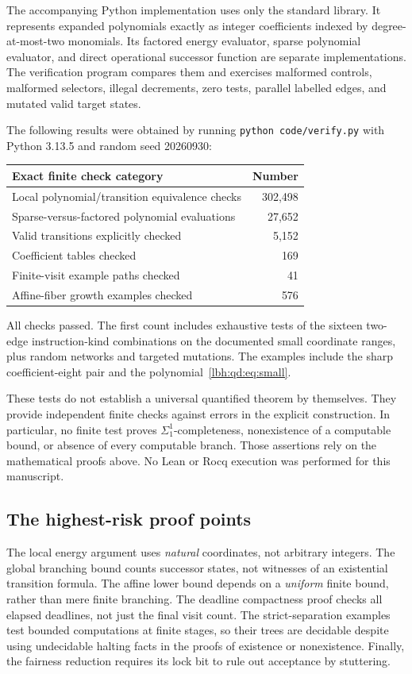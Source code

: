 \documentclass[11pt,letterpaper]{article}
\theoremstyle{definition}
\theoremstyle{remark}
\newcommand{\1}{\mathbf 1}
\begin{document}
The accompanying Python implementation uses only the standard library.
It represents expanded polynomials exactly as integer coefficients indexed
by degree-at-most-two monomials. Its factored energy evaluator, sparse
polynomial evaluator, and direct operational successor function are separate
implementations. The verification program compares them and exercises
malformed controls, malformed selectors, illegal decrements, zero tests,
parallel labelled edges, and mutated valid target states.

The following results were obtained by running \texttt{python code/verify.py}
with Python 3.13.5 and random seed 20260930:
\begin{center}
\begin{tabular}{@{}lr@{}}
\toprule
Exact finite check category & Number\\
\midrule
Local polynomial/transition equivalence checks & 302,498\\
Sparse-versus-factored polynomial evaluations & 27,652\\
Valid transitions explicitly checked & 5,152\\
Coefficient tables checked & 169\\
Finite-visit example paths checked & 41\\
Affine-fiber growth examples checked & 576\\
\bottomrule
\end{tabular}
\end{center}
All checks passed. The first count includes exhaustive tests of the sixteen
two-edge instruction-kind combinations on the documented small coordinate
ranges, plus random networks and targeted mutations. The examples include
the sharp coefficient-eight pair and the polynomial~\eqref{lbh:qd:eq:small}.

These tests do not establish a universal quantified theorem by themselves.
They provide independent finite checks against errors in the explicit
construction. In particular, no finite test proves $\Sigma^1_1$-completeness,
nonexistence of a computable bound, or absence of every computable branch.
Those assertions rely on the mathematical proofs above. No Lean or Rocq
execution was performed for this manuscript.

\subsection{The highest-risk proof points}

The local energy argument uses \emph{natural} coordinates, not arbitrary
integers. The global branching bound counts successor states, not witnesses
of an existential transition formula. The affine lower bound depends on a
\emph{uniform} finite bound, rather than mere finite branching. The deadline
compactness proof checks all elapsed deadlines, not just the final visit
count. The strict-separation examples test bounded computations at finite
stages, so their trees are decidable despite using undecidable halting facts
in the proofs of existence or nonexistence. Finally, the fairness reduction
requires its lock bit to rule out acceptance by stuttering.
\end{document}
